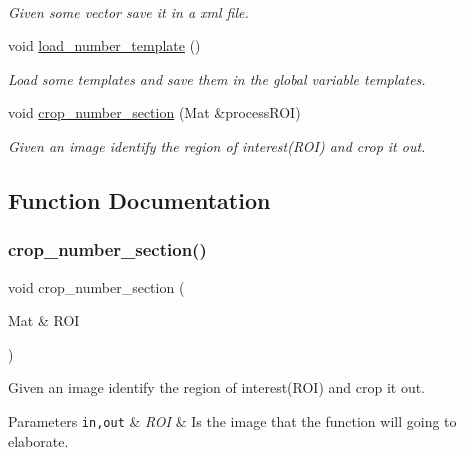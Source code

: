 \begin{DoxyCompactItemize}
$$\begin{DoxyCompactList}\small\item\em Given some vector save it in a xml file. \end{DoxyCompactList}\item 
void \mbox{\hyperlink{detection_8hh_a50993b0aa4f01d89a4e5d0aef4e1e5f4}{load\+\_\+number\+\_\+template}} ()
\begin{DoxyCompactList}\small\item\em Load some templates and save them in the global variable \textquotesingle{}templates\textquotesingle{}. \end{DoxyCompactList}\item 
void \mbox{\hyperlink{detection_8hh_a8edaf0da54add7cd1461bafecef26b56}{crop\+\_\+number\+\_\+section}} (Mat \&process\+R\+OI)
\begin{DoxyCompactList}\small\item\em Given an image identify the region of interest(\+R\+O\+I) and crop it out. \end{DoxyCompactList}\end{DoxyCompactItemize}


\subsection{Function Documentation}
\mbox{\label{detection_8hh_a8edaf0da54add7cd1461bafecef26b56}} 
\subsubsection{\texorpdfstring{crop\+\_\+number\+\_\+section()}{crop\_number\_section()}}
{\footnotesize\ttfamily void crop\+\_\+number\+\_\+section (\begin{DoxyParamCaption}\item[{Mat \&}]{R\+OI }\end{DoxyParamCaption})}



Given an image identify the region of interest(\+R\+O\+I) and crop it out. 


\begin{DoxyParams}[1]{Parameters}
\mbox{\tt in,out}  & {\em R\+OI} & Is the image that the function will going to elaborate. \\
\hline
\end{DoxyParams}
\mbox{\label{detection_8hh_a17e13c447692201697b084a1906cf6fb}} 
